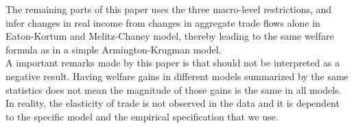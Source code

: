 \documentclass{article}
\begin{document}
The remaining parts of this paper uses the three macro-level restrictions, and infer changes
in real income from changes in aggregate trade flows alone in Eaton-Kortum and Melitz-Chaney model, thereby leading to the
same welfare formula as in a simple Armington-Krugman model.\\

A important remarks made by this paper is that should not be interpreted as a negative result. Having
welfare gains in different models summarized by the same statistics
does not mean the magnitude of those gains is the same in all
models.
In reality, the elasticity of trade is
not observed in the data and it is dependent to the specific model and the empirical specification that we use.
\end{document}
